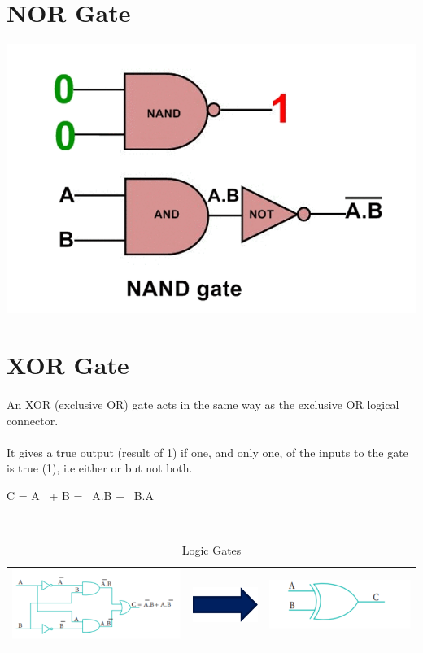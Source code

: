 \documentclass{article}
\begin{document}
\section{NOR Gate}
\includegraphics[width=1.2\linewidth]{nandm}
\newpage



\section{XOR Gate}
\paragraph{}
An XOR (exclusive OR) gate acts in the same way as the exclusive OR logical connector. 
\paragraph{}
It gives a true output (result of 1) if one, and only one, of the inputs to the gate is true (1), i.e either or but not both.
\begin{center}
	C = A ~+ B = ~A.B + ~B.A
\end{center}
\\
\begin{table}[h!]
	\begin{center}
		\caption{Logic Gates}
		\label{tab:table1}
		\begin{tabular}{l c c}
			\includegraphics[width=0.25\linewidth]{xor1}
			&
			\includegraphics[width=0.13\linewidth]{arrow}
			&
			\includegraphics[width=0.25\linewidth]{xor2}
			\\
		\end{tabular}
	\end{center}
\end{table}
\end{document}
